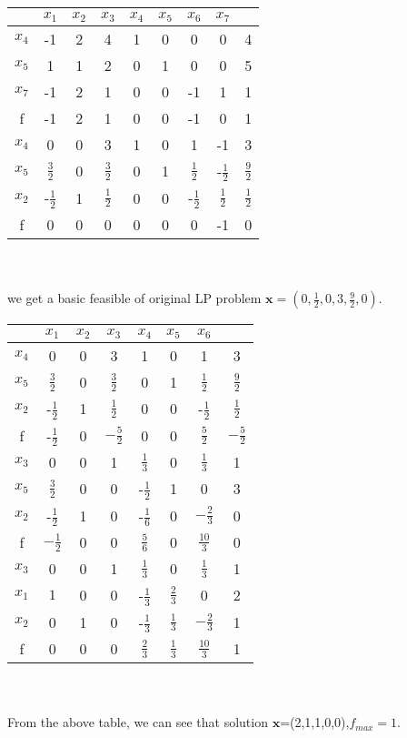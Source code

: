 \documentclass[paper=a4, fontsize=11pt]{scrartcl} %
\numberwithin{equation}{section} %
\numberwithin{figure}{section} %
\numberwithin{table}{section} %
\begin{document}
\begin{enumerate}
\begin{tabular}{|c|c|c|c|c|c|c|c|c|}
\hline &$x_1$&$x_2$&$x_3$&$x_4$&$x_5$&$x_6$&$x_7$&\\
\hline$x_4$&-1&2&4&1&0&0&0&4\\
$x_5$&1&1&2&0&1&0&0&5\\
$x_7$&-1&\Large{\textcircled{\small{2}}}&1&0&0&-1&1&1\\
\hline f&-1&2&1&0&0&-1&0&1\\
\hline
\hline $x_4$&0 & 0 & 3& 1& 0& 1&-1&3\\
$x_5$&$\frac{3}{2}$&0&$\frac{3}{2}$&0&1&$\frac{1}{2}$&-$\frac{1}{2}$&$\frac{9}{2}$\\
$x_2$&-$\frac{1}{2}$& 1&$\frac{1}{2}$& 0& 0&-$\frac{1}{2}$&$\frac{1}{2}$&$\frac{1}{2}$\\
\hline f    &0 & 0&0& 0& 0& 0& -1&0\\
\hline
\end{tabular}
\\\\
we get a basic feasible of original LP problem $\mathbf{x}=(0,\frac{1}{2},0,3,\frac{9}{2},0)$.

\begin{tabular}{|c|c|c|c|c|c|c|c|}
\hline &$x_1$&$x_2$&$x_3$&$x_4$&$x_5$&$x_6$&\\
\hline$x_4$&0&0&\Large{\textcircled{\small{3}}}&1&0&1&3\\
$x_5$&$\frac{3}{2}$&0&$\frac{3}{2}$&0&1&$\frac{1}{2}$&$\frac{9}{2}$\\
$x_2$&-$\frac{1}{2}$&1&$\frac{1}{2}$&0&0&-$\frac{1}{2}$&$\frac{1}{2}$\\
\hline f&-$\frac{1}{2}$&0&$-\frac{5}{2}$&0&0&$\frac{5}{2}$&$-\frac{5}{2}$\\
\hline
\hline $x_3$&0 & 0& 1& $\frac{1}{3}$& 0& $\frac{1}{3}$&1\\
$x_5$&\Large{\textcircled{\small{$\frac{3}{2}$}}}&0&0&-$\frac{1}{2}$&1&0&3\\
$x_2$&-$\frac{1}{2}$& 1& 0& -$\frac{1}{6}$&0&$-\frac{2}{3}$&0\\
\hline f    &$-\frac{1}{2}$ & 0&0&$\frac{5}{6}$& 0&$\frac{10}{3}$&0\\
\hline
\hline $x_3$&0 & 0& 1& $\frac{1}{3}$& 0& $\frac{1}{3}$&1\\
$x_1$&$1$&0&0&-$\frac{1}{3}$&$\frac{2}{3}$&0&2\\
$x_2$&0 & 1& 0& -$\frac{1}{3}$&$\frac{1}{3}$&$-\frac{2}{3}$&1\\
\hline f    & 0& 0&0&$\frac{2}{3}$&$\frac{1}{3}$&$\frac{10}{3}$&1\\
\hline
\end{tabular}
\\\\
From the above table, we can see that solution $\mathbf{x}$=(2,1,1,0,0),$f_{max}=1$.



\end{enumerate}
\end{document}
